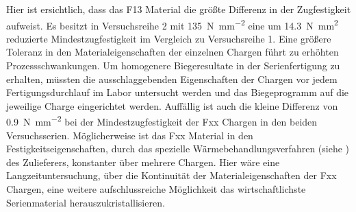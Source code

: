 \documentclass[12pt,a4paper,parskip]{scrartcl}
\begin{document}
Hier ist ersichtlich, dass das F13 Material die größte Differenz in der Zugfestigkeit aufweist. Es besitzt in Versuchsreihe 2 mit  \SI{135}{\newton\per\milli\meter\squared} eine um \SI{14,3}{\newton\milli\meter\squared} reduzierte Mindestzugfestigkeit im Vergleich zu Versuchsreihe 1. Eine größere Toleranz in den Materialeigenschaften der einzelnen Chargen führt zu erhöhten Prozessschwankungen. Um homogenere Biegeresultate in der Serienfertigung zu erhalten,  müssten die ausschlaggebenden Eigenschaften der Chargen vor jedem Fertigungsdurchlauf im Labor untersucht werden und das Biegeprogramm auf die jeweilige Charge eingerichtet werden. Auffällig ist auch die kleine Differenz von \SI{0,9}{\newton\per\milli\meter\squared} bei der Mindestzugfestigkeit der Fxx Chargen in den beiden Versuchsserien. Möglicherweise ist das Fxx Material in den Festigkeitseigenschaften,  durch das spezielle Wärmebehandlungsverfahren (siehe ) des Zulieferers, konstanter über mehrere Chargen. Hier wäre eine Langzeituntersuchung,  über die Kontinuität der Materialeigenschaften der Fxx Chargen,  eine weitere aufschlussreiche Möglichkeit das wirtschaftlichste Serienmaterial herauszukristallisieren. 
  





\newpage
\end{document}
